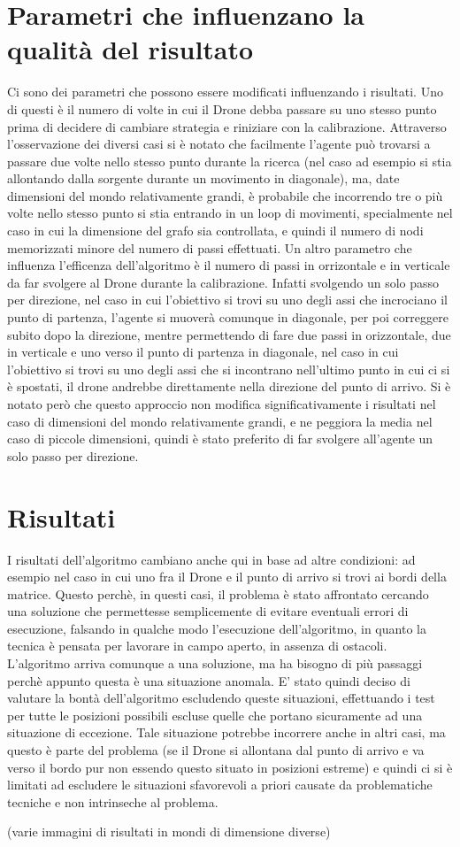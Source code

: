 \section{Parametri che influenzano la qualità del risultato}
Ci sono dei parametri che possono essere modificati influenzando i risultati. Uno di questi è il numero di volte in cui il Drone debba passare su uno stesso punto prima di decidere di cambiare strategia e riniziare con la calibrazione. Attraverso l'osservazione dei diversi casi si è notato che facilmente l'agente può trovarsi a passare due volte nello stesso punto durante la ricerca (nel caso ad esempio si stia allontando dalla sorgente durante un movimento in diagonale), ma, date dimensioni del mondo relativamente grandi, è probabile che incorrendo tre o più volte nello stesso punto si stia entrando in un loop di movimenti, specialmente nel caso in cui la dimensione del grafo sia controllata, e quindi il numero di nodi memorizzati minore del numero di passi effettuati.
Un altro parametro che influenza l'efficenza dell'algoritmo è il numero di passi in orrizontale e in verticale da far svolgere al Drone durante la calibrazione. Infatti svolgendo un solo passo per direzione, nel caso in cui l'obiettivo si trovi su uno degli assi che incrociano il punto di partenza, l'agente si muoverà comunque in diagonale, per poi correggere subito dopo la direzione, mentre permettendo di fare due passi in orizzontale, due in verticale e uno verso il punto di partenza in diagonale, nel caso in cui l'obiettivo si trovi su uno degli assi che si incontrano nell'ultimo punto in cui ci si è spostati, il drone andrebbe direttamente nella direzione del punto di arrivo. Si è notato però che questo approccio non modifica significativamente i risultati nel caso di dimensioni del mondo relativamente grandi, e ne peggiora la media nel caso di piccole dimensioni, quindi è stato preferito di far svolgere all'agente un solo passo per direzione.
	
\section{Risultati}
I risultati dell'algoritmo cambiano anche qui in base ad altre condizioni: ad esempio nel caso in cui uno fra il Drone e il punto di arrivo si trovi ai bordi della matrice. Questo perchè, in questi casi, il problema è stato affrontato cercando una soluzione che permettesse semplicemente di evitare eventuali errori di esecuzione, falsando in qualche modo l'esecuzione dell'algoritmo, in quanto la tecnica è pensata per lavorare in campo aperto, in assenza di ostacoli. L'algoritmo arriva comunque a una soluzione, ma ha bisogno di più passaggi perchè appunto questa è una situazione anomala. E' stato quindi deciso di valutare la bontà dell'algoritmo escludendo queste situazioni, effettuando i test per tutte le posizioni possibili escluse quelle che portano sicuramente ad una situazione di eccezione. Tale situazione potrebbe incorrere anche in altri casi, ma questo è parte del problema (se il Drone si allontana dal punto di arrivo e va verso il bordo pur non essendo questo situato in posizioni estreme) e quindi ci si è limitati ad escludere le situazioni sfavorevoli a priori causate da problematiche tecniche e non intrinseche al problema.

(varie immagini di risultati in mondi di dimensione diverse)

